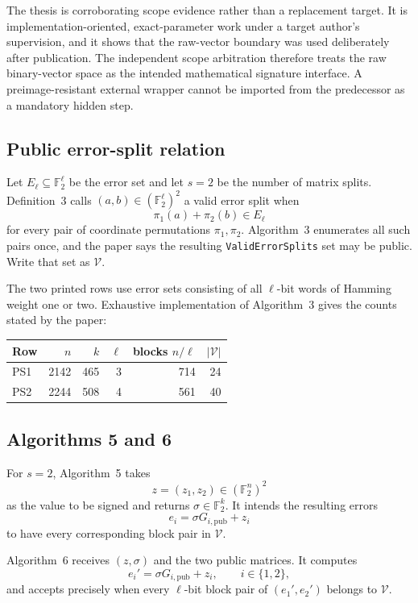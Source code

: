 \documentclass[10pt,a4paper]{article}
\newcommand{\F}{\mathbb{F}}
\newcommand{\VES}{\mathcal{V}}
\begin{document}
The thesis is corroborating scope evidence rather than a replacement target.
It is implementation-oriented, exact-parameter work under a target author's
supervision, and it shows that the raw-vector boundary was used deliberately
after publication.  The independent scope arbitration therefore treats the
raw binary-vector space as the intended mathematical signature interface.  A
preimage-resistant external wrapper cannot be imported from the predecessor as
a mandatory hidden step.

\subsection{Public error-split relation}

Let $E_\ell\subseteq\F_2^\ell$ be the error set and let $s=2$ be the number
of matrix splits.  Definition~3 calls $(a,b)\in(\F_2^\ell)^2$ a valid error
split when
\[
  \pi_1(a)+\pi_2(b)\in E_\ell
\]
for every pair of coordinate permutations $\pi_1,\pi_2$.  Algorithm~3
enumerates all such pairs once, and the paper says the resulting
\texttt{ValidErrorSplits} set may be public.  Write that set as $\VES$.

The two printed rows use error sets consisting of all $\ell$-bit words of
Hamming weight one or two.  Exhaustive implementation of Algorithm~3 gives
the counts stated by the paper:
\begin{center}
\begin{tabular}{lrrrrr}
\toprule
Row & $n$ & $k$ & $\ell$ & blocks $n/\ell$ & $|\VES|$ \\
\midrule
PS1 & 2142 & 465 & 3 & 714 & 24 \\
PS2 & 2244 & 508 & 4 & 561 & 40 \\
\bottomrule
\end{tabular}
\end{center}

\subsection{Algorithms 5 and 6}

For $s=2$, Algorithm~5 takes
\[
 z=(z_1,z_2)\in(\F_2^n)^2
\]
as the value to be signed and returns $\sigma\in\F_2^k$.  It intends the
resulting errors
\[
 e_i=\sigma G_{i,\mathrm{pub}}+z_i
\]
to have every corresponding block pair in $\VES$.

Algorithm~6 receives $(z,\sigma)$ and the two public matrices.  It computes
\begin{equation}
 e_i'=\sigma G_{i,\mathrm{pub}}+z_i,
 \qquad i\in\{1,2\},
 \label{eq:verify}
\end{equation}
and accepts precisely when every $\ell$-bit block pair of $(e_1',e_2')$
belongs to $\VES$.
\end{document}
